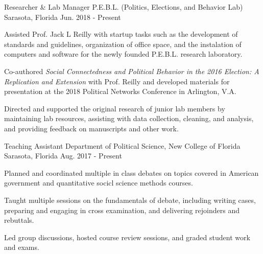 

\begin{cventries}

    \cventry
      {Researcher \& Lab Manager} %
      {P.E.B.L. (Politics, Elections, and Behavior Lab)} %
      {Sarasota, Florida} %
      {Jun. 2018 - Present} %
      {
        \begin{cvitems} %
          \item {Assisted Prof. Jack L Reilly with startup tasks such as the development of standards and guidelines, organization of office space, and the instalation of computers and software for the newly founded P.E.B.L. research laboratory.}
          \item {Co-authored \emph{Social Connectedness and Political Behavior in the 2016 Election: A Replication and Extension} with Prof. Reilly and developed materials for presentation at the 2018 Political Networks Conference in Arlington, V.A.}
          \item {Directed and supported the original research of junior lab members by maintaining lab resources, assisting with data collection, cleaning, and analysis, and providing feedback on manuscripts and other work.}
      \end{cvitems}
      }

    \cventry
      {Teaching Assistant} %
      {Department of Political Science, New College of Florida} %
      {Sarasota, Florida} %
      {Aug. 2017 - Present} %
      {
        \begin{cvitems} %
          \item {Planned and coordinated multiple in class debates on topics covered in American government and quantitative socicl science methods courses.}
          \item {Taught multiple sessions on the fundamentals of debate, including writing cases, preparing and engaging in cross examination, and delivering rejoinders and rebuttals.}
          \item {Led group discussions, hosted course review sessions, and graded student work and exams.}
        \end{cvitems}
      }


\end{cventries}
